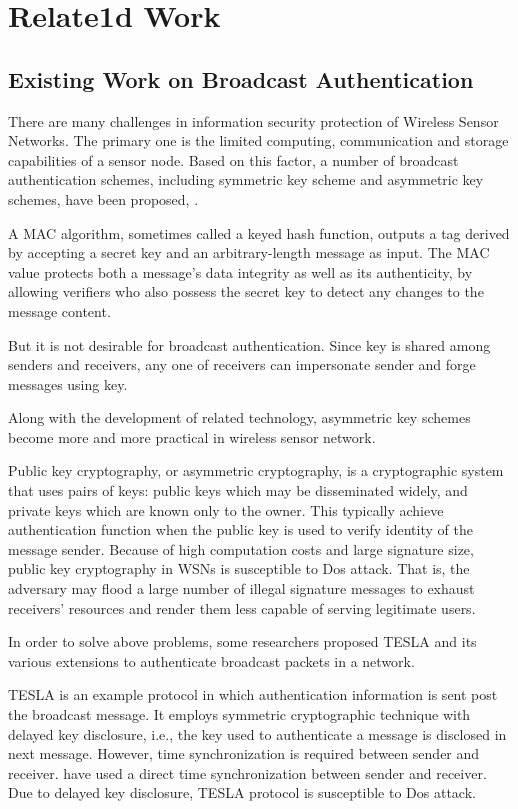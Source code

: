 \documentclass{sig-alternate-05-2015}
\begin{document}
\section{Relate1d Work}
\subsection{Existing Work on Broadcast Authentication}
There are many challenges in information security protection of Wireless Sensor Networks. The primary one is the limited computing, communication and storage capabilities of a sensor node. Based on this factor, a number of broadcast authentication schemes, including symmetric key scheme and asymmetric key schemes, have been proposed, . 

A MAC algorithm, sometimes called a keyed hash function, outputs a tag derived by accepting a secret key and an arbitrary-length message as input\cite{TinySec}. The MAC value protects both a message's data integrity as well as its authenticity, by allowing verifiers who also possess the secret key to detect any changes to the message content.

But it is not desirable for broadcast authentication. Since key is shared among senders and receivers, any one of receivers can impersonate sender and forge messages using key.

Along with the development of related technology, asymmetric key schemes become more and more practical in wireless sensor network. 

Public key cryptography, or asymmetric cryptography, is a cryptographic system that uses pairs of keys: public keys which may be disseminated widely, and private keys which are known only to the owner. This typically achieve authentication function when the public key is used to verify identity of the message sender. Because of high computation costs and large signature size, public key cryptography in WSNs is susceptible to Dos attack. That is, the adversary may flood a large number of illegal signature messages to exhaust receivers' resources and render them less capable of serving legitimate users. 

In order to solve above problems, some researchers proposed TESLA\cite{Tesla} and its various extensions \cite{multi} to authenticate broadcast packets in a network.

TESLA is an example protocol in which authentication information is sent post the broadcast message. It employs symmetric cryptographic technique with delayed key disclosure, i.e., the key used to authenticate a message is disclosed in next message. However, time synchronization is required between sender and receiver. \cite{Tesla} have used a direct time synchronization between sender and receiver. Due to delayed key disclosure, TESLA protocol is susceptible to Dos attack.
\end{document}
